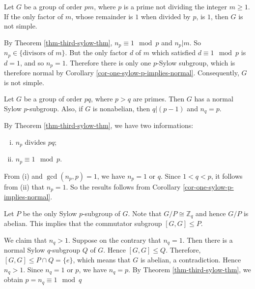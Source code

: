 \begin{proposition}
	Let $G$ be a group of order $pm$, where $p$ is a prime not dividing the integer $m\geq 1$. If the only factor of $m$, whose remainder is $1$ when divided by $p$, is $1$,  then $G$ is not simple.
\end{proposition}
\begin{sketch}
By Theorem \ref{thm-third-sylow-thm},  $n_p \equiv 1\mod p$ and $n_p |m$. So $n_p\in \{\text{divisors of }m\}$. But the only factor $d$ of $m$ which satisfied $d\equiv 1 \mod p$ is $d=1$, and so $n_p = 1$. Therefore there is only one $p$-Sylow subgroup, which is therefore normal by Corollary \ref{cor-one-sylow-p-implies-normal}. Consequently, $G$ is not simple.
\end{sketch}

\begin{proposition} \label{prop-sylow-order-pq}
	Let $G$ be a group of order
	$pq$, where $p > q$ are primes. Then $G$ has a
	normal Sylow $p$-subgroup. Also, if $G$ is nonabelian, then $q|(p-
	1)$ and $n_q = p$. 
\end{proposition}
\begin{sketch}
	By Theorem \ref{thm-third-sylow-thm}, we have two informations:
	\begin{enumerate}[(i)]
		\item $n_p$ divides $pq$;
		\item $n_p\equiv 1 \mod p$.
	\end{enumerate} 
	From (i) and $\gcd(n_p,p)=1$, we have $n_p = 1$ or $q$.  Since $1<q<p$, it follows from (ii) that $n_p = 1$. So the results follows from Corollary \ref{cor-one-sylow-p-implies-normal}.
	
	Let $P$ be the only Sylow $p$-subgroup of $G$. Note that $G/P\cong \mathbb{Z}_q$ and hence $G/P$ is abelian. This implies that the commutator subgroup $[G,G]\leq P$.
	
	We claim that $n_q>1$. Suppose on the contrary that $n_q = 1$. Then there is a normal Sylow $q$-subgroup $Q$ of $G$. Hence $[G,G]\leq Q$. Therefore, $[G,G]\leq P\cap Q = \{e\}$, which means that $G$ is abelian, a contradiction. Hence $n_q>1$. Since $n_q = 1$ or $p$, we have $n_q=p$. By Theorem \ref{thm-third-sylow-thm}, we obtain $p = n_q\equiv 1\mod q$
\end{sketch}



